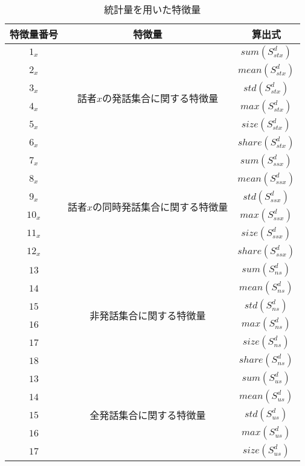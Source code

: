 \begin{table}[htpb]
  \caption{統計量を用いた特徴量}
  \centering
  \begin{tabular}{|c|c|c|}
      \hline
      特徴量番号 & 特徴量 & 算出式 \\\hline\hline
      $1_x$ & \multirow{6}{*}{話者$x$の発話集合に関する特徴量} & $sum(S^d_{stx})$ \\ \cline{1-1}\cline{3-3}
      $2_x$ & & $mean(S^d_{stx})$ \\ \cline{1-1}\cline{3-3}
      $3_x$ & & $std(S^d_{stx})$ \\ \cline{1-1}\cline{3-3}
      $4_x$ & & $max(S^d_{stx})$ \\ \cline{1-1}\cline{3-3}
      $5_x$ & & $size(S^d_{stx})$ \\ \cline{1-1}\cline{3-3}
      $6_x$ & & $share(S^d_{stx})$ \\ \hline
      $7_x$ & \multirow{6}{*}{話者$x$の同時発話集合に関する特徴量} & $sum(S^d_{ssx})$ \\ \cline{1-1}\cline{3-3}
      $8_x$ & & $mean(S^d_{ssx})$ \\ \cline{1-1}\cline{3-3}
      $9_x$ & & $std(S^d_{ssx})$ \\ \cline{1-1}\cline{3-3}
      $10_x$ & & $max(S^d_{ssx})$ \\ \cline{1-1}\cline{3-3}
      $11_x$ & & $size(S^d_{ssx})$ \\ \cline{1-1}\cline{3-3}
      $12_x$ & & $share(S^d_{ssx})$ \\ \hline
      $13$ & \multirow{6}{*}{非発話集合に関する特徴量} & $sum(S^d_{ns})$ \\ \cline{1-1}\cline{3-3}
      $14$ & & $mean(S^d_{ns})$ \\ \cline{1-1}\cline{3-3}
      $15$ & & $std(S^d_{ns})$ \\ \cline{1-1}\cline{3-3}
      $16$ & & $max(S^d_{ns})$ \\ \cline{1-1}\cline{3-3}
      $17$ & & $size(S^d_{ns})$ \\ \cline{1-1}\cline{3-3}
      $18$ & & $share(S^d_{ns})$ \\ \hline
      $13$ & \multirow{6}{*}{全発話集合に関する特徴量} & $sum(S^d_{us})$ \\ \cline{1-1}\cline{3-3}
      $14$ & & $mean(S^d_{us})$ \\ \cline{1-1}\cline{3-3}
      $15$ & & $std(S^d_{us})$ \\ \cline{1-1}\cline{3-3}
      $16$ & & $max(S^d_{us})$ \\ \cline{1-1}\cline{3-3}
      $17$ & & $size(S^d_{us})$ \\ \cline{1-1}\cline{3-3}

\end{tabular}
\end{table}
